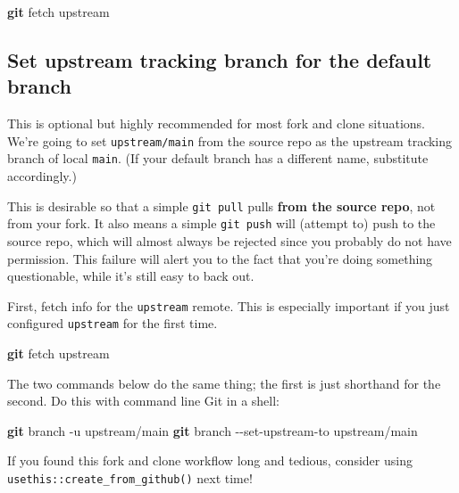 \documentclass[
]{book}
\newenvironment{Shaded}{\begin{snugshade}}{\end{snugshade}}
\newcommand{\AttributeTok}[1]{\textcolor[rgb]{0.13,0.29,0.53}{#1}}
\newcommand{\FunctionTok}[1]{\textcolor[rgb]{0.13,0.29,0.53}{\textbf{#1}}}
\newcommand{\NormalTok}[1]{#1}
\begin{document}
\begin{Shaded}
\begin{Highlighting}[]
\FunctionTok{git}\NormalTok{ fetch upstream}
\end{Highlighting}
\end{Shaded}

\subsection{Set upstream tracking branch for the default branch}\label{fork-set-upstream-tracking-main}

This is optional but highly recommended for most fork and clone situations.
We're going to set \texttt{upstream/main} from the source repo as the upstream tracking branch of local \texttt{main}.
(If your default branch has a different name, substitute accordingly.)

This is desirable so that a simple \texttt{git\ pull} pulls \textbf{from the source repo}, not from your fork.
It also means a simple \texttt{git\ push} will (attempt to) push to the source repo, which will almost always be rejected since you probably do not have permission.
This failure will alert you to the fact that you're doing something questionable, while it's still easy to back out.

First, fetch info for the \texttt{upstream} remote.
This is especially important if you just configured \texttt{upstream} for the first time.

\begin{Shaded}
\begin{Highlighting}[]
\FunctionTok{git}\NormalTok{ fetch upstream}
\end{Highlighting}
\end{Shaded}

The two commands below do the same thing; the first is just shorthand for the second.
Do this with command line Git in a shell:

\begin{Shaded}
\begin{Highlighting}[]
\FunctionTok{git}\NormalTok{ branch }\AttributeTok{{-}u}\NormalTok{ upstream/main}
\FunctionTok{git}\NormalTok{ branch }\AttributeTok{{-}{-}set{-}upstream{-}to}\NormalTok{ upstream/main}
\end{Highlighting}
\end{Shaded}

If you found this fork and clone workflow long and tedious, consider using \texttt{usethis::create\_from\_github()} next time!
\end{document}
